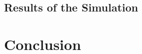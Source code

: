 \documentclass[10pt,twocolumn,a4paper,conference]{IEEEtran}
\begin{document}
\subsection{Results of the Simulation } 



\section{Conclusion} \label{sec:conclusions}



\small 
\end{document}

